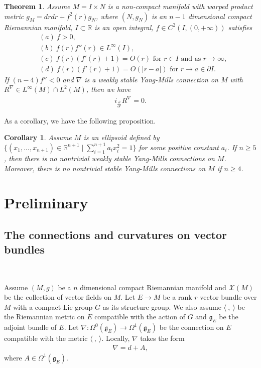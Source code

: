 \documentclass{amsart}
\newtheorem{theorem}{Theorem}[section]
\newtheorem{corollary}{Corollary}[section]
\begin{document}
	\begin{theorem}\label{thm 3}
		Assume $M=I\times N$ is a non-compact manifold with warped product metric $g_M=drdr+f^2(r)g_N$, where $(N,g_N)$ is an $n-1$ dimensional compact Riemannian manifold, $I\subset\mathbb{R}$ is an open integral, $f\in C^2(I,(0,+\infty))$ satisfies
		\begin{equation}\label{condition for f}
			\begin{split}
				&(a)\ f>0,\\
				&(b)\ f(r)f''(r)\in L^\infty(I),\\
				&(c)\ f(r)(f'(r)+1)=O(r)\textrm{ for }r\in I\textrm{ and as }r\to\infty,\\
				&(d)\ f(r)(f'(r)+1)=O(|r-a|)\textrm{ for }r\to a\in\partial I.
			\end{split}
		\end{equation}
		If $(n-4)f''<0$ and $\nabla$ is a weakly stable Yang-Mills connection on $M$ with $R^\nabla\in L^\infty(M)\cap L^2(M)$, then we have
		\begin{align*}
			i_{\frac\partial{\partial r}}R^\nabla=0.
		\end{align*}
	\end{theorem}
	As a corollary, we have the following proposition.
	\begin{corollary}
		Assume $M$ is an ellipsoid defined by $\{(x_1,...,x_{n+1})\in\mathbb{R}^{n+1}\mid\sum_{i=1}^{n+1}a_ix_i^2=1\}$ for some positive constant $a_i$. If $n\ge5$, then there is no nontrivial weakly stable Yang-Mills connections on $M$. Moreover, there is no nontrivial stable Yang-Mills connections on $M$ if $n\ge4$.
	\end{corollary}
	\section{Preliminary}
	\subsection{The connections and curvatures on vector bundles}\ 
	
	Assume $(M,g)$ be a $n$ dimensional compact Riemannian manifold and $\mathscr{X}(M)$ be the collection of vector fields on $M$. Let $E\to M$ be a rank $r$ vector bundle over $M$ with a compact Lie group $G$ as its structure group. We also assume $\langle\ ,\ \rangle$ be the Riemannian metric on $E$ compatible with the action of $G$ and $\mathfrak{g}_E$ be the adjoint bundle of $E$. Let $\nabla:\Omega^0(\mathfrak{g}_E)\to\Omega^1(\mathfrak{g}_E)$ be the connection on $E$ compatible with the metric $\langle\ ,\ \rangle$. Locally, $\nabla$ takes the form
	\begin{align*}
		\nabla=d+A,
	\end{align*}
	where $A\in\Omega^1(\mathfrak{g}_E)$.
	
\end{document}
